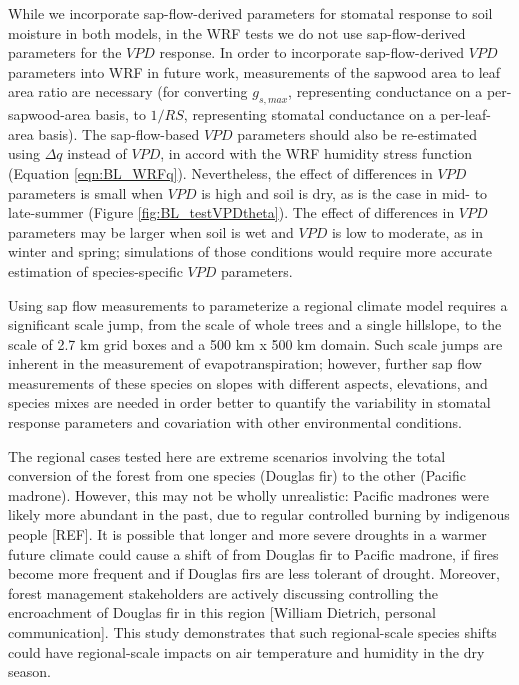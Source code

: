 While we incorporate sap-flow-derived parameters for stomatal response to soil moisture in both models, in the WRF tests we do not use sap-flow-derived parameters for the $VPD$ response.  In order to incorporate sap-flow-derived $VPD$ parameters into WRF in future work, measurements of the sapwood area to leaf area ratio are necessary (for converting $g_{s,max}$, representing conductance on a per-sapwood-area basis, to $1/RS$, representing stomatal conductance on a per-leaf-area basis).  The sap-flow-based $VPD$ parameters should also be re-estimated using $\Delta q$ instead of $VPD$, in accord with the WRF humidity stress function (Equation \ref{eqn:BL_WRFq}).  Nevertheless, the effect of differences in $VPD$ parameters is small when $VPD$ is high and soil is dry, as is the case in mid- to late-summer (Figure \ref{fig:BL_testVPDtheta}).  The effect of differences in $VPD$ parameters may be larger when soil is wet and $VPD$ is low to moderate, as in winter and spring; simulations of those conditions would require more accurate estimation of species-specific $VPD$ parameters.

Using sap flow measurements to parameterize a regional climate model requires a significant scale jump, from the scale of whole trees and a single hillslope, to the scale of 2.7 km grid boxes and a 500 km x 500 km domain.  Such scale jumps are inherent in the measurement of evapotranspiration; however, further sap flow measurements of these species on slopes with different aspects, elevations, and species mixes are needed in order better to quantify the variability in stomatal response parameters and covariation with other environmental conditions.

The regional cases tested here are extreme scenarios involving the total conversion of the forest from one species (Douglas fir) to the other (Pacific madrone).  However, this may not be wholly unrealistic: Pacific madrones were likely more abundant in the past, due to regular controlled burning by indigenous people [REF].  It is possible that longer and more severe droughts in a warmer future climate could cause a shift of from Douglas fir to Pacific madrone, if fires become more frequent and if Douglas firs are less tolerant of drought.  Moreover, forest management stakeholders are actively discussing controlling the encroachment of Douglas fir in this region [William Dietrich, personal communication]. This study demonstrates that such regional-scale species shifts could have regional-scale impacts on air temperature and humidity in the dry season.

